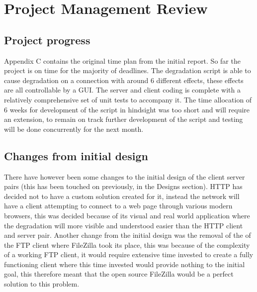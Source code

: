 \chapter{Project Management Review}

\section{Project progress}
Appendix C contains the original time plan from the initial report. So far the project is on time for the majority of deadlines. The degradation script is able to cause degradation on a connection with around 6 different effects, these effects are all controllable by a GUI. The server and client coding is complete with a relatively comprehensive set of unit tests to accompany it. The time allocation of 6 weeks for development of the script in hindsight was too short and will require an extension, to remain on track further development of the script and testing will be done concurrently for the next month.

\section{Changes from initial design}
There have however been some changes to the initial design of the client server pairs (this has been touched on previously, in the Designs section). HTTP has decided not to have a custom solution created for it, instead the network will have a client attempting to connect to a web page through various modern browsers, this was decided because of its visual and real world application where the degradation will more visible and understood easier than the HTTP client and server pair. 
Another change from the initial design was the removal of the of the FTP client where FileZilla took its place, this was because of the complexity of a working FTP client, it would require extensive time invested to create a fully functioning client where this time invested would provide nothing to the initial goal, this therefore meant that the open source FileZilla would be a perfect solution to this problem.


